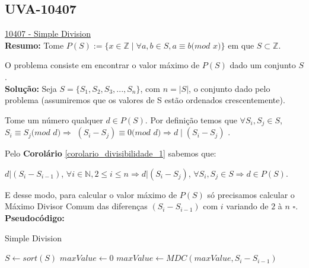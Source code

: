 \subsection{UVA-10407}
\href{https://uva.onlinejudge.org/index.php?option=onlinejudge&page=show_problem&problem=1348}{10407 - Simple Division} \\

\textbf{Resumo:} 
Tome $P(S) := \{ x \in \mathbb{Z} \mid  \forall a , b \in S , a \equiv b ( mod$ $x)\}$ em que $S \subset \mathbb{Z}$.

O problema consiste em encontrar o valor máximo de $P(S)$ dado um conjunto $S$.
\\

\textbf{Solução:} 
Seja $S = \{S_1, S_2, S_3, ..., S_n\}$, com $n = |S|$, o conjunto dado pelo problema (assumiremos que os valores de S estão ordenados crescentemente).

Tome um número qualquer $d \in P(S)$. Por definição temos que $\forall S_i, S_j \in S$, $S_i \equiv S_j ( mod$ $d) \Rightarrow $ 
$ (S_i-S_j) \equiv 0 ( mod$ $d) \Rightarrow d \mid (S_i-S_j)$ .

Pelo \textbf{Corolário} \autoref{corolario_divisibilidade_1} sabemos que:

$d | (S_i-S_{i-1})$, $ \forall i \in \mathbb{N}, 2 \leq i \leq n \Rightarrow d | (S_i-S_j)$, $ \forall S_i, S_j \in S \Rightarrow d \in P(S)$.

E desse modo, para calcular o valor máximo de $P(S)$ só precisamos calcular o Máximo Divisor Comum das diferenças $(S_i-S_{i-1})$ com $i$ variando de $2$ à $n$ $\square$.
\\

\textbf{Pseudocódigo:}
\begin{algorithm}
\caption{Simple Division}\label{euclid}
\begin{algorithmic}[1]
\State $S \gets sort(S)$  
\State $maxValue \gets 0$
\State $maxValue \gets MDC(maxValue, S_i - S_{i-1})$
\EndFor
\State {}
\EndProcedure
\end{algorithmic}
\end{algorithm}


